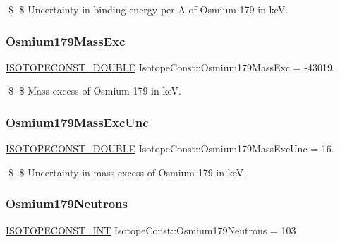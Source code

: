 \$ \$ Uncertainty in binding energy per A of Osmium-\/179 in keV. \mbox{\label{group___isotope_const-_osmium-_os179_ga9f48bb9696dca3395c91a58b3e1acb40}} 
\subsubsection{\texorpdfstring{Osmium179\+Mass\+Exc}{Osmium179MassExc}}
{\footnotesize\ttfamily \mbox{\hyperlink{group___isotope_const-_macros_ga8f45a7272ce02c0b4c65c44636ed719a}{I\+S\+O\+T\+O\+P\+E\+C\+O\+N\+S\+T\+\_\+\+D\+O\+U\+B\+LE}} Isotope\+Const\+::\+Osmium179\+Mass\+Exc = -\/43019.}

\$ \$ Mass excess of Osmium-\/179 in keV. \mbox{\label{group___isotope_const-_osmium-_os179_gafe9424e97c85b52fbdee2689dfe19f9e}} 
\subsubsection{\texorpdfstring{Osmium179\+Mass\+Exc\+Unc}{Osmium179MassExcUnc}}
{\footnotesize\ttfamily \mbox{\hyperlink{group___isotope_const-_macros_ga8f45a7272ce02c0b4c65c44636ed719a}{I\+S\+O\+T\+O\+P\+E\+C\+O\+N\+S\+T\+\_\+\+D\+O\+U\+B\+LE}} Isotope\+Const\+::\+Osmium179\+Mass\+Exc\+Unc = 16.}

\$ \$ Uncertainty in mass excess of Osmium-\/179 in keV. \mbox{\label{group___isotope_const-_osmium-_os179_ga57acb16b6f2ca1c5cada07e9a36fd16e}} 
\subsubsection{\texorpdfstring{Osmium179\+Neutrons}{Osmium179Neutrons}}
{\footnotesize\ttfamily \mbox{\hyperlink{group___isotope_const-_macros_ga5f18360b3e99483a35c32d789e62621c}{I\+S\+O\+T\+O\+P\+E\+C\+O\+N\+S\+T\+\_\+\+I\+NT}} Isotope\+Const\+::\+Osmium179\+Neutrons = 103}

